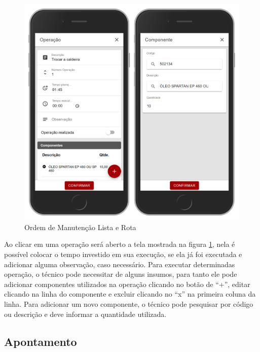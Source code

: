 \begin{figure}[H]
	\caption{\label{mobile-om-operacao}Ordem de Manutenção Lista e Rota}
	\begin{center}
		\includegraphics[scale=0.55]{./Figuras/agil.it/mobile-om-operacao.jpg}
	\end{center}
\end{figure}

Ao clicar em uma operação será aberto a tela mostrada na figura \ref{mobile-om-operacao}, nela é possível colocar o tempo investido em sua execução, se ela já foi executada e adicionar alguma observação, caso necessário.
Para executar determinadas operação, o técnico pode necessitar de alguns insumos, para tanto ele pode adicionar componentes utilizados na operação clicando no botão de ``+'', editar clicando na linha do componente e excluir clicando no ``x'' na primeira coluna da linha.
Para adicionar um novo componente, o técnico pode pesquisar por código ou descrição e deve informar a quantidade utilizada.

\subsection{Apontamento}

